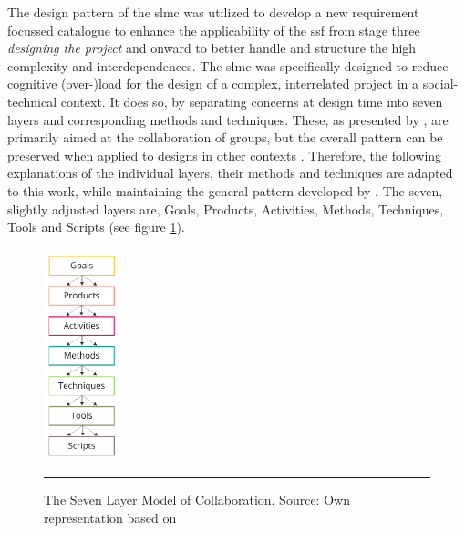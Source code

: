 The design pattern of the \acrshort{slmc} was utilized to develop a new requirement focussed catalogue to enhance the applicability of the \acrshort{ssf} from stage three \textit{designing the project} and onward to better handle and structure the high complexity and interdependences. The \acrshort{slmc} was specifically designed to reduce cognitive (over-)load for the design of a complex, interrelated project in a social-technical context. It does so, by separating concerns at design time into seven layers and corresponding methods and techniques. These, as presented by \autocite{briggsSevenLayerModelCollaboration2009}, are primarily aimed at the collaboration of groups, but the overall pattern can be preserved when applied to designs in other contexts \autocite{diggelenGroundedDesignDesign2009}. Therefore, the following explanations of the individual layers, their methods and techniques are adapted to this work, while maintaining the general pattern developed by \autocite{briggsSevenLayerModelCollaboration2009}. The seven, slightly adjusted layers are, Goals, Products, Activities, Methods, Techniques, Tools and Scripts (see figure \ref{fig:meth_slmc}).\newline
\pagebreak
\begin{figure}
    \vspace{20pt}
    \centering
    \includegraphics[width=0.2\textwidth]{figures/2023_MA_methods_slmc_vertical_arrows.pdf}
    \rule{0.25\textwidth}{0.1pt}
    \caption[The Seven Layer Model of Collaboration]{The Seven Layer Model of Collaboration. Source: Own representation based on \autocite{briggsSevenLayerModelCollaboration2009}}
    \label{fig:meth_slmc}
    \vspace{20pt}
\end{figure}
